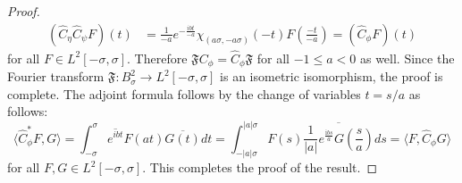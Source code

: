 \documentclass[10pt,a4paper]{amsart}
\begin{document}
\begin{proof}
\begin{align*}
(\widehat{C}_{\eta}\widehat{C}_{\psi}F)(t)&=\frac{1}{-a}e^{-\frac{ibt}{-a}}\chi_{(a\sigma, -a\sigma)}(-t)F\left(\frac{-t}{-a}\right)
=(\widehat{C}_{\phi}F)(t)
\end{align*}
for all $F\in L^2[-\sigma,\sigma]$. Therefore $\mathfrak{F}C_{\phi}= \widehat{C}_{\phi}\mathfrak{F}$ for all $-1\leq a<0$ as well. Since the Fourier transform $\mathfrak{F}:B^2_\sigma\to L^2[-\sigma,\sigma]$ is an isometric isomorphism, the proof is complete. The adjoint 
formula follows by the change of variables $t=s/a$ as follows:
\[
\langle \widehat{C}_{\phi}^*F, G\rangle=\int^\sigma_{-\sigma}\overline{e^{ibt}}F(at)\overline{G(t)}dt=\int^{|a|\sigma}_{-|a|\sigma}F(s)\overline{\frac{1}{|a|}e^{\frac{\mathrm{i}bs}{a}}G\left(\frac{s}{a}\right)}ds=\langle F, \widehat{C}_{\phi}G\rangle
\]
for all $F,G\in L^2[-\sigma,\sigma]$. This completes the proof of the result.
\end{proof}
\end{document}
